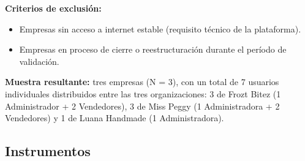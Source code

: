 \textbf{Criterios de exclusión:}

\begin{itemize}
\tightlist
\item
  Empresas sin acceso a internet estable (requisito técnico de la plataforma).
\item
  Empresas en proceso de cierre o reestructuración durante el período de validación.
\end{itemize}

\textbf{Muestra resultante:} tres empresas (N = 3), con un total de 7 usuarios individuales distribuidos entre las tres organizaciones: 3 de Frozt Bitez (1 Administrador + 2 Vendedores), 3 de Miss Peggy (1 Administradora + 2 Vendedores) y 1 de Luana Handmade (1 Administradora).

\subsection{Instrumentos}\label{instrumentos}

